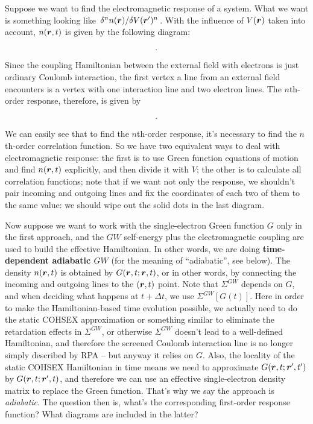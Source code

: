 \documentclass[hyperref, a4paper]{report}
\newcommand*{\concept}[1]{{\textbf{#1}}}
\begin{document}
Suppose we want to find the electromagnetic response of a system. 
What we want is something looking like $\fdv*[n]{n(\vb*{r})}{V(\vb*{r}')}$.
With the influence of $V(\vb*{r})$ taken into account, 
$n(\vb*{r}, t)$ is given by the following diagram: 
\[
    \protect.
\]
Since the coupling Hamiltonian between the external field with electrons 
is just ordinary Coulomb interaction, 
the first vertex a line from an external field encounters 
is a vertex with one interaction line and two electron lines.
The $n$th-order response, therefore, is given by 
\[
    \protect.
\]
We can easily see that to find the $n$th-order response,
it's necessary to find the $n$th-order correlation function.
So we have two equivalent ways to deal with electromagnetic response: 
the first is to use Green function equations of motion 
and find $n(\vb*{r}, t)$ explicitly,
and then divide it with $V$;
the other is to calculate all correlation functions;
note that if we want not only the response, 
we shouldn't pair incoming and outgoing lines 
and fix the coordinates of each two of them to the same value:
we should wipe out the solid dots in the last diagram.

Now suppose we want to work with the single-electron Green function $G$ only
in the first approach,
and the $GW$ self-energy plus the electromagnetic coupling 
are used to build the effective Hamiltonian. 
In other words, we are doing \concept{time-dependent adiabatic $GW$} 
(for the meaning of ``adiabatic'', see below).
The density $n(\vb*{r}, t)$ is obtained by $G(\vb*{r}, t; \vb*{r}, t)$,
or in other words, 
by connecting the incoming and outgoing lines to the $(\vb*{r}, t)$ point.
Note that $\Sigma^{GW}$ depends on $G$,
and when deciding what happens at $t + \Delta t$,
we use $\Sigma^{GW}[G(t)]$.
Here in order to make the Hamiltonian-based time evolution possible, 
we actually need to do the static COHSEX approximation or something similar 
to eliminate the retardation effects in $\Sigma^{GW}$,
or otherwise $\Sigma^{GW}$ doesn't lead to a well-defined Hamiltonian,
and therefore the screened Coulomb interaction line is no longer 
simply described by RPA
-- but anyway it relies on $G$.
Also, the locality of the static COHSEX Hamiltonian in time 
means we need to approximate $G(\vb*{r}, t; \vb*{r}', t')$
by $G(\vb*{r}, t; \vb*{r}', t)$,
and therefore we can use an effective single-electron density matrix 
to replace the Green function.
That's why we say the approach is \emph{adiabatic}.
The question then is, 
what's the corresponding first-order response function?
What diagrams are included in the latter? 
\end{document}
